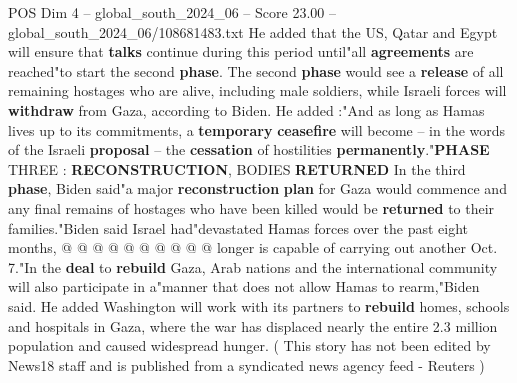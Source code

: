 \begin{textsample}{POS Dim 4 – global\_south\_2024\_06 – Score 23.00 – global\_south\_2024\_06/108681483.txt}
He added that the US, Qatar and Egypt will ensure that \textbf{talks} continue during this period until"all \textbf{agreements} are reached"to start the second \textbf{phase}.
The second \textbf{phase} would see a \textbf{release} of all remaining hostages who are alive, including male soldiers, while Israeli forces will \textbf{withdraw} from Gaza, according to Biden.
He added :"And as long as Hamas lives up to its commitments, a \textbf{temporary} \textbf{ceasefire} will become -- in the words of the Israeli \textbf{proposal} -- the \textbf{cessation} of hostilities \textbf{permanently}."\textbf{PHASE} THREE : \textbf{RECONSTRUCTION}, BODIES \textbf{RETURNED} In the third \textbf{phase}, Biden said"a major \textbf{reconstruction} \textbf{plan} for Gaza would commence and any final remains of hostages who have been killed would be \textbf{returned} to their families."Biden said Israel had"devastated Hamas forces over the past eight months, @ @ @ @ @ @ @ @ @ @ longer is capable of carrying out another Oct. 7."In the \textbf{deal} to \textbf{rebuild} Gaza, Arab nations and the international community will also participate in a"manner that does not allow Hamas to rearm,"Biden said.
He added Washington will work with its partners to \textbf{rebuild} homes, schools and hospitals in Gaza, where the war has displaced nearly the entire 2.3 million population and caused widespread hunger. ( This story has not been edited by News18 staff and is published from a syndicated news agency feed - Reuters )

\end{textsample}
